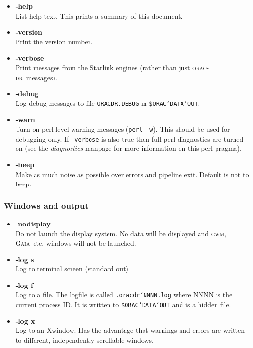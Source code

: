 \documentclass[twoside,11pt]{article}
\newcommand{\xref}[3]{#1}
\renewcommand{\_}{\texttt{\symbol{95}}}
\newcommand{\oracdr}{\textsc{orac-dr}}
\newcommand{\gaia}{\xref{{\textsc{Gaia}}}{sun214}{}}
\newcommand{\gwm}{\xref{\textsc{gwm}}{sun219}{}}
\begin{document}
\begin{itemize}

\item{\bf -help}
\hfil\\
List help text. This prints a summary of this document.

\item{\bf -version}
\hfil\\
Print the version number.

\item{\bf -verbose}
\hfil\\
Print messages from the Starlink engines (rather than just \oracdr\
messages).

\item{\bf -debug}
\hfil\\
Log debug messages to file {\tt ORACDR.DEBUG} in {\tt \$ORAC\char`\_DATA\char`\_OUT}.

\item{\bf -warn}
\hfil\\
Turn on perl level warning messages ({\tt perl -w}). This should be
used for debugging only. If {\tt -verbose} is also true then full 
perl diagnostics are turned on (see the {\em diagnostics\/} manpage for more information
on this perl pragma).

\item{\bf -beep}
\hfil\\
Make as much noise as possible over errors and pipeline exit.
Default is not to beep.

\end{itemize}

\subsubsection*{Windows and output}

\begin{itemize}

\item{\bf -nodisplay}
\hfil\\
Do not launch the display system. No data will be displayed and \gwm,
\gaia\ etc. windows will not be launched.

\item{\bf -log s}
\hfil\\
Log to terminal screen (standard out)

\item{\bf -log f}
\hfil\\
Log to a file. The logfile is called {\tt .oracdr\char`\_NNNN.log} where NNNN 
is the current process ID. It is written to {\tt \$ORAC\char`\_DATA\char`\_OUT} and is 
a hidden file.

\item{\bf -log x}
\hfil\\
Log to an Xwindow. Has the advantage that warnings and errors are
written to different, independently scrollable windows.

\end{itemize}
\end{document}
